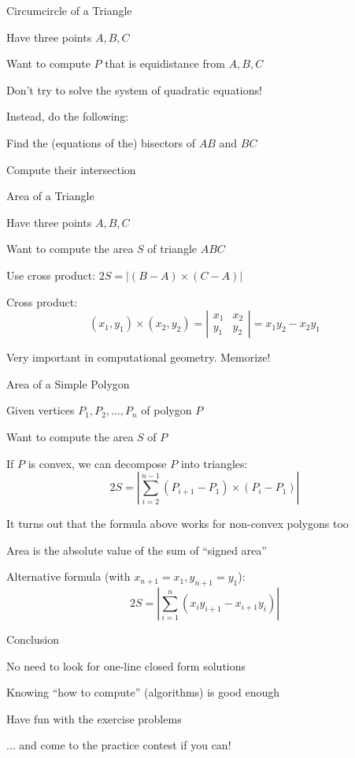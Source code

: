\documentclass[13pt,onlymath]{beamer}
\begin{document}
\begin{frame}{Circumcircle of a Triangle}
\BIT
\item Have three points $A, B, C$
\item Want to compute $P$ that is equidistance from $A, B, C$

\item Don't try to solve the system of quadratic equations!
\item Instead, do the following:
\BIT
\item Find the (equations of the) bisectors of $AB$ and $BC$
\item Compute their intersection
\EIT
\EIT
\end{frame}

\begin{frame}{Area of a Triangle}
\BIT
\item Have three points $A, B, C$
\item Want to compute the area $S$ of triangle $ABC$
\item Use cross product: $2S = |(B-A) \times (C-A)|$
\item Cross product:
\[
(x_1, y_1) \times (x_2, y_2) = \left| \begin{array}{cc} x_1 & x_2 \\ y_1 & y_2 \end{array}\right| = x_1 y_2 - x_2 y_1
\]
\BIT
\item Very important in computational geometry. Memorize!
\EIT
\EIT
\end{frame}

\begin{frame}{Area of a Simple Polygon}
\BIT
\item Given vertices $P_1, P_2, \ldots, P_n$ of polygon $P$
\item Want to compute the area $S$ of $P$
\item If $P$ is convex, we can decompose $P$ into triangles:
\[
2S = \left| \sum_{i=2}^{n-1}(P_{i+1} - P_1) \times (P_i - P_1) \right|
\]
\item It turns out that the formula above works for non-convex polygons too
\BIT
\item Area is the absolute value of the sum of ``signed area''
\EIT
\item Alternative formula (with $x_{n+1} = x_1, y_{n+1} = y_1$):
\[
2S = \left| \sum_{i=1}^n (x_i y_{i+1} - x_{i+1} y_i) \right|
\]
\EIT
\end{frame}

\begin{frame}{Conclusion}
\BIT
\item No need to look for one-line closed form solutions
\item Knowing ``how to compute'' (algorithms) is good enough

\item Have fun with the exercise problems
\BIT
\item ... and come to the practice contest if you can!
\EIT
\EIT
\end{frame}
\end{document}

